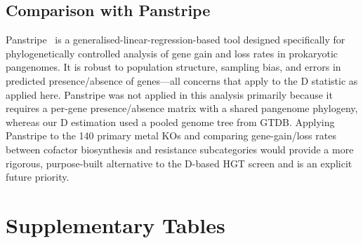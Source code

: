 \documentclass[11pt]{article}
\begin{document}
\subsection{Comparison with Panstripe}

Panstripe~\cite{tonkinhill2023} is a generalised-linear-regression-based tool designed specifically for phylogenetically controlled analysis of gene gain and loss rates in prokaryotic pangenomes.
It is robust to population structure, sampling bias, and errors in predicted presence/absence of genes---all concerns that apply to the D statistic as applied here.
Panstripe was not applied in this analysis primarily because it requires a per-gene presence/absence matrix with a shared pangenome phylogeny, whereas our D estimation used a pooled genome tree from GTDB.
Applying Panstripe to the 140 primary metal KOs and comparing gene-gain/loss rates between cofactor biosynthesis and resistance subcategories would provide a more rigorous, purpose-built alternative to the D-based HGT screen and is an explicit future priority.

\clearpage
\section*{Supplementary Tables}
\setcounter{table}{1}

\end{document}
